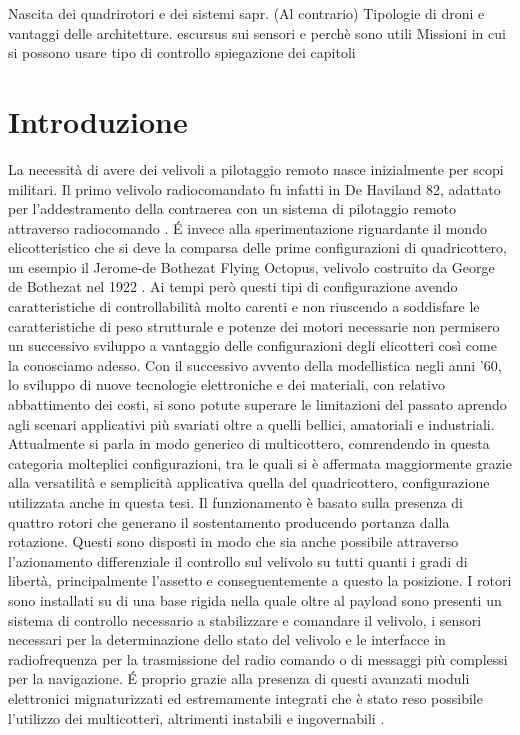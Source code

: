 \begin{scaletta}
	Nascita dei quadrirotori e dei sistemi sapr. (Al contrario)
	Tipologie di droni e vantaggi delle architetture. escursus sui sensori e perchè sono utili
	Missioni in cui si possono usare
	tipo di controllo
	spiegazione dei capitoli
\end{scaletta}
\chapter{Introduzione}
La necessità di avere dei velivoli a pilotaggio remoto nasce inizialmente per scopi militari. Il primo velivolo radiocomandato fu infatti in De Haviland 82, adattato per l'addestramento della contraerea con un sistema di pilotaggio remoto attraverso radiocomando \cite{histoDrone}. \'E invece alla sperimentazione riguardante il mondo elicotteristico che si deve la comparsa delle prime configurazioni di quadricottero, un esempio il Jerome-de Bothezat Flying Octopus, velivolo costruito da George de Bothezat nel 1922 \cite{Young}. Ai tempi però questi tipi di configurazione avendo caratteristiche di controllabilità molto carenti e non riuscendo a soddisfare le caratteristiche di peso strutturale e potenze dei motori necessarie non permisero un successivo sviluppo a vantaggio delle configurazioni degli elicotteri così come la conosciamo adesso. Con il successivo avvento della modellistica negli anni '60, lo sviluppo di nuove tecnologie elettroniche e dei materiali, con relativo abbattimento dei costi, si sono potute superare le limitazioni del passato aprendo agli scenari applicativi più svariati oltre a quelli bellici, amatoriali e industriali. 
Attualmente si parla in modo generico di multicottero, comrendendo in questa categoria molteplici configurazioni, tra le quali si è affermata maggiormente grazie alla versatilità e semplicità applicativa quella del quadricottero, configurazione utilizzata anche in questa tesi. Il funzionamento è basato sulla presenza di quattro rotori che generano il sostentamento producendo portanza dalla rotazione. Questi sono disposti in modo che sia anche possibile attraverso l'azionamento differenziale il controllo sul velivolo su tutti quanti i gradi di libertà, principalmente l'assetto e conseguentemente a questo la posizione. I rotori sono installati su di una base rigida nella quale oltre al payload sono presenti un sistema di controllo necessario a stabilizzare e comandare il velivolo, i sensori necessari per la determinazione dello stato del velivolo e le interfacce in radiofrequenza per la trasmissione del radio comando o di messaggi più complessi per la navigazione. \'E proprio grazie alla presenza di questi avanzati moduli elettronici mignaturizzati ed estremamente integrati che è stato reso possibile l'utilizzo dei multicotteri, altrimenti instabili e ingovernabili \cite{multi2015}. 

